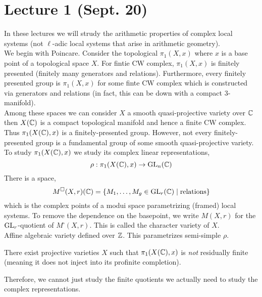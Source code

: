 \documentclass[12pt]{article}
\begin{document}
\section{Lecture 1 (Sept. 20)}

\newcommand{\Msq}{M^{\square}}
\newcommand{\LL}{\mathbb{L}}
\newcommand{\alg}{\mathrm{alg}}
\newcommand{\X}{\mathfrak{X}}
\newcommand{\tame}{\mathrm{tame}}
\newcommand{\irred}{\mathrm{irred}}
\newcommand{\cH}{\mathscr{H}}
\renewcommand{\gr}{\mathbf{gr}}
\newcommand{\Fil}{\mathrm{Fil}}

In these lectures we will strudy the arithmetic properties of complex local systems (not $\ell$-adic local systems that arise in arithmetic geometry).
\bigskip\\
We begin with Poincare. Consider the topological $\pi_1(X, x)$ where $x$ is a base point of a topological space $X$. For fintie CW complex, $\pi_1(X, x)$ is finitely presented (finitely many generators and relations). Furthermore, every finitely presented group is $\pi_1(X, x)$ for some finte CW complex which is constructed via generators and relations (in fact, this can be down with a compact 3-manifold). 
\bigskip\\
Among these spaces we can consider $X$ a smooth quasi-projective variety over $\mathbb{C}$ then $X(\mathbb{C})$ is a compact topological manifold and hence a finite CW complex. Thus $\pi_1(X(\mathbb{C}), x)$ is a finitely-presented group. However, not every finitely-presented group is a fundamental group of some smooth quasi-projective variety. 
\bigskip\\
To study $\pi_1(X(\mathbb{C}), x)$ we study its complex linear representations,
\[ \rho : \pi_1(X(\mathbb{C}), x) \to \mathrm{GL}_n(\mathbb{C}) \]
There is a space,
\[ \Msq(X, r)(\CC) = \{ M_1, \dots, M_g \in \GL_r(\CC) \mid \text{relations} \} \]
which is the complex points of a modui space parametrizing (framed) local systems. To remove the dependence on the basepoint, we write $M(X, r)$ for the $\mathrm{GL}_r$-quotient of $\Msq(X, r)$. This is called the character variety of $X$. 
\bigskip\\
Affine algebraic variety defined over $\mathbb{Z}$. This parametrizes semi-simple $\rho$.

\begin{theorem}[Toledo]
There exist projective varieties $X$ such that $\pi_1(X(\mathbb{C}), x)$ is \textit{not} residually finite (meaning it does not inject into its profinite completion). 
\end{theorem}

\begin{rmk}
Therefore, we cannot just study the finite quotients we actually need to study the complex representations. 
\end{rmk}
\end{document}
